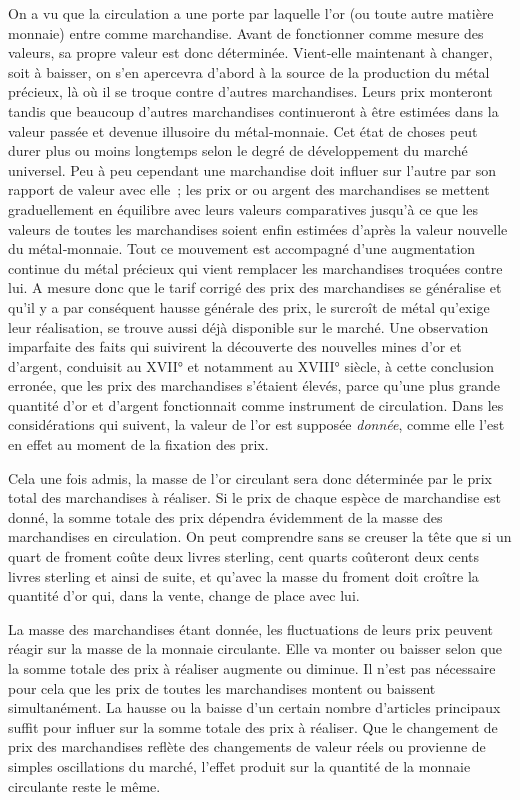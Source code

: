 \documentclass[french,twoside]{book} %
\begin{document}
On a vu que la circulation a une porte par laquelle l’or (ou toute autre matière monnaie) entre comme marchandise. Avant de fonctionner comme mesure des valeurs, sa propre valeur est donc déterminée. Vient‑elle maintenant à changer, soit à baisser, on s’en apercevra d’abord à la source de la production du métal précieux, là où il se troque contre d’autres marchandises. Leurs prix monteront tandis que beaucoup d’autres marchandises continueront à être estimées dans la valeur passée et devenue illusoire du métal‑monnaie. Cet état de choses peut durer plus ou moins longtemps selon le degré de développement du marché universel. Peu à peu cependant une marchandise doit influer sur l’autre par son rapport de valeur avec elle ; les prix or ou argent des marchandises se mettent graduellement en équilibre avec leurs valeurs comparatives jusqu’à ce que les valeurs de toutes les marchandises soient enfin estimées d’après la valeur nouvelle du métal‑monnaie. Tout ce mouvement est accompagné d’une augmentation continue du métal précieux qui vient remplacer les marchandises troquées contre lui. A mesure donc que le tarif corrigé des prix des marchandises se généralise et qu’il y a par conséquent hausse générale des prix, le surcroît de métal qu’exige leur réalisation, se trouve aussi déjà disponible sur le marché. Une observation imparfaite des faits qui suivirent la découverte des nouvelles mines d’or et d’argent, conduisit au XVII° et notamment au XVIII° siècle, à cette conclusion erronée, que les prix des marchandises s’étaient élevés, parce qu’une plus grande quantité d’or et d’argent fonctionnait comme instrument de circulation. Dans les considérations qui suivent, la valeur de l’or est supposée \emph{donnée}, comme elle l’est en effet au moment de la fixation des prix.\par
Cela une fois admis, la masse de l’or circulant sera donc déterminée par le prix total des marchandises à réaliser. Si le prix de chaque espèce de marchandise est donné, la somme totale des prix dépendra évidemment de la masse des marchandises en circulation. On peut comprendre sans se creuser la tête que si un quart de froment coûte deux livres sterling, cent quarts coûteront deux cents livres sterling et ainsi de suite, et qu’avec la masse du froment doit croître la quantité d’or qui, dans la vente, change de place avec lui.\par
La masse des marchandises étant donnée, les fluctuations de leurs prix peuvent réagir sur la masse de la monnaie circulante. Elle va monter ou baisser selon que la somme totale des prix à réaliser augmente ou diminue. Il n’est pas nécessaire pour cela que les prix de toutes les marchandises montent ou baissent simultanément. La hausse ou la baisse d’un certain nombre d’articles principaux suffit pour influer sur la somme totale des prix à réaliser. Que le changement de prix des marchandises reflète des changements de valeur réels ou provienne de simples oscillations du marché, l’effet produit sur la quantité de la monnaie circulante reste le même.\par
\end{document}
